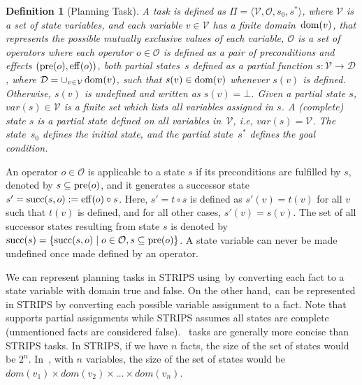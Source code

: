 \documentclass[ppgc,diss,english]{iiufrgs}
\newtheorem{definition}{Definition}
\begin{document}
\begin{definition}[\sas Planning Task]\label{def:sas}
A \sas task is defined as $\Pi=\langle\mathcal{V},\mathcal{O},s_0,s^*\rangle$, where $\mathcal{V}$ is a set of state variables, and each variable $v\in \mathcal{V}$ has a finite domain~$\operatorname{dom}(v)$, that represents the possible mutually exclusive values of each variable, $\mathcal{O}$ is a set of operators where each operator $o \in \mathcal{O}$ is defined as a pair of preconditions and effects $(\operatorname{pre}(o),\operatorname{eff}(o))$, both partial states~$s$ defined as a partial function $s:\mathcal{V}\rightarrow \mathcal{D}$, where $\mathcal{D}=\cup_{v\in \mathcal{V}}\operatorname{dom}(v)$, such that $s(v)\in \operatorname{dom}(v)$ whenever $s(v)$ is defined. Otherwise, $s(v)$ is undefined and written as $s(v)=\bot$. Given a partial state $s$, $var(s) \in \mathcal{V}$ is a finite set which lists all variables assigned in $s$. A (complete) state $s$ is a partial state defined on all variables in~$\mathcal{V}$, i.e, $var(s) = \mathcal{V}$. The state~$s_0$ defines the initial state, and the partial state~$s^*$ defines the goal condition.
\end{definition}

An operator $o \in \mathcal{O}$ is applicable to a state $s$ if its preconditions are fulfilled by $s$, denoted by $s \subseteq \operatorname{pre}(o)$, and it generates a successor state $s'=\operatorname{succ}(s,o):=\operatorname{eff}(o)\circ s$. Here, $s'=t\circ s$ is defined as $s'(v)=t(v)$ for all $v$ such that $t(v)$ is defined, and for all other cases, $s'(v)=s(v)$. The set of all successor states resulting from state $s$ is denoted by $\operatorname{succ}(s)=\{{\operatorname{succ}(s,o)\mid o\in \mathcal{O}, s \subseteq \operatorname{pre}(o)}\}$. A state variable can never be made undefined once made defined by an operator.

We can represent planning tasks in STRIPS using~\sas by converting each fact to a state variable with domain true and false. On the other hand,~\sas can be represented in STRIPS by converting each possible variable assignment to a fact. Note that \sas supports partial assignments while STRIPS assumes all states are complete (unmentioned facts are considered false).
~\sas tasks are generally more concise than STRIPS tasks. In STRIPS, if we have $n$ facts, the size of the set of states would be $2^n$. In~\sas, with $n$ variables, the size of the set of states would be $dom(v_{1}) \times dom(v_{2}) \times \ldots \times dom(v_{n})$.
\end{document}
